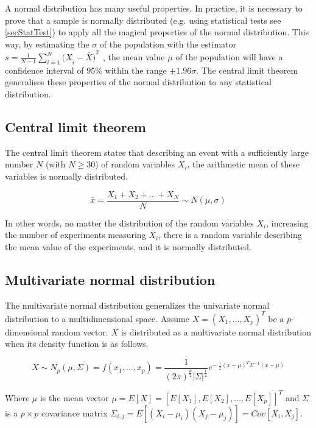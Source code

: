 A normal distribution has many useful properties. In practice, it is necessary to prove that a sample is normally distributed (e.g. using statistical tests see \ref{secStatTest}) to apply all the magical properties of the normal distribution. This way, by estimating the $\sigma$ of the population with the estimator $s=\frac{1}{N-1}\sum_{i=1}^{N}{{{(X}_i-\bar{X})}^2\ \ }$, the mean value $\mu$ of the population will have a confidence interval of 95\% within the range $\pm1.96\sigma$. The central limit theorem generalises these properties of the normal distribution to any statistical distribution.

\subsection{Central limit theorem}
The central limit theorem states that describing an event with a sufficiently large number $N$ (with $N\geq30$) of random variables $X_i$, the arithmetic mean of these variables is normally distributed.

\begin{equation}
\bar{x}=\frac{X_1+X_2+\ldots+X_N}{N} \sim N(\mu,\sigma)
\label{eq_centralLimitTheorem}
\end{equation}



In other words, no matter the distribution of the random variables $X_i$, increasing the number of experiments measuring $X_i$, there is a random variable describing the mean value of the experiments, and it is normally distributed.

\subsection{Multivariate normal distribution}
The multivariate normal distribution generalizes the univariate normal distribution to a multidimensional space. Assume $X=\left(X_1,\ldots,X_p\right)^T$ be a $p$-dimensional random vector. $X$ is distributed as a multivariate normal distribution when its density function is as follows.

\begin{equation}
X\sim N_p\left(\mu,\Sigma\right)= f\left(x_1,\ldots,x_p\right)=\frac{1}{\left(2\pi\right)^\frac{p}{2}\left|\Sigma\right|^\frac{1}{2}}e^{-\ \frac{1}{2}\left(x-\mu\right)^T\Sigma^{-1}(x-\mu)}
\label{eq_multivariateNormal}
\end{equation}

Where $\mu$ is the mean vector $\mu=E\left[X\right]=\left[E\left[X_1\right],E\left[X_2\right],\ldots,E\left[X_p\right]\right]^T$ and $\Sigma$ is a $p\times p$ covariance matrix $\Sigma_{i,j}=E\left[\left(X_i-\mu_i\right)\left(X_j-\mu_j\right)\right]=Cov[X_i,X_j]$.

